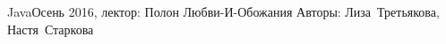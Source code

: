 


\BigHeader
	{Java}{Осень 2016, лектор: Полон Любви-И-Обожания}
	{Авторы: Лиза~Третьякова, Настя~Старкова}


